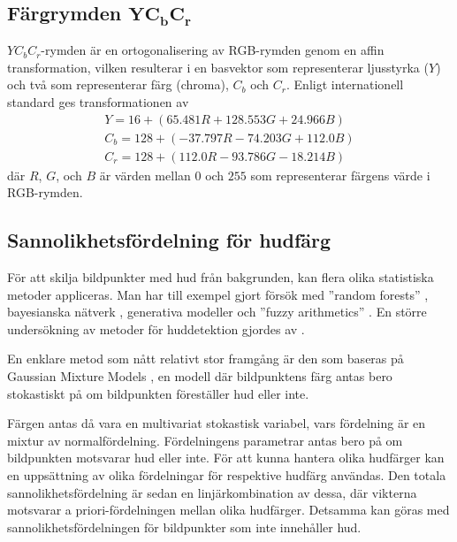 \documentclass[../rapport_MVEX01-11-05]{subfiles}
\begin{document}
\subsection[Färgrymden $\mathrm{YC_bC_r}$]{Färgrymden $\mathbf{YC_bC_r}$}
$YC_bC_r$-rymden är en ortogonalisering av RGB-rymden genom en
affin transformation, vilken resulterar i en basvektor som
representerar ljusstyrka ($Y$) och två som representerar färg (chroma), $C_b$ och $C_r$. Enligt
internationell standard \cite{ITU-BT601} ges
transformationen av
\begin{equation*}
  \label{eq:farg:ycbcr}
  \begin{gathered}
  Y   = 16  + ( 65.481R + 128.553G + 24.966B)\\
  C_b = 128 + (-37.797R - 74.203G  + 112.0B )\\
  C_r = 128 + (112.0R   - 93.786G  - 18.214B)
  \end{gathered}
\end{equation*}
där $R$, $G$, och $B$ är värden mellan $0$ och $255$ som representerar
färgens värde i RGB-rymden.

\subsection{Sannolikhetsfördelning för hudfärg}\label{sec:klassificering:hud}
För att skilja bildpunkter med hud från bakgrunden,
kan flera olika statistiska metoder
appliceras. Man har till exempel gjort försök med 
''random forests''
\cite{Khan10}, bayesianska nätverk \cite{Sebe04}, generativa modeller
\cite{Kruppa02}
och ''fuzzy arithmetics'' \cite{Shang10}. En större undersökning av metoder
för huddetektion gjordes av .

En enklare metod som nått relativt stor framgång är den som baseras på
Gaussian Mixture Models \cite{Elmezain08,Hassanpour08}, en modell där
bildpunktens färg antas bero stokastiskt på om
bildpunkten föreställer hud eller inte.

Färgen antas då vara en multivariat stokastisk variabel, vars
fördelning är en mixtur av normalfördelning. Fördelningens parametrar
antas bero på om bildpunkten motsvarar hud eller inte. För att kunna
hantera olika hudfärger kan en
uppsättning av olika
fördelningar för respektive hudfärg användas. Den totala
sannolikhetsfördelning är sedan en linjärkombination av dessa, där
vikterna motsvarar a priori-fördelningen mellan olika hudfärger. Detsamma
kan göras med sannolikhetsfördelningen för bildpunkter som inte
innehåller hud.
\end{document}
